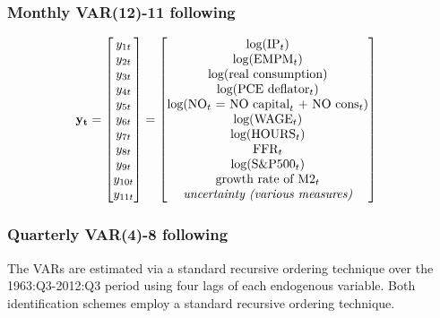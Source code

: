\documentclass[a4paper,11pt,listof=nochaptergap,oneside,pointednumbers,bibtotoc,bigheadings,liststotoc,hidelinks]{scrbook}
\theoremstyle{mysatz}
\theoremstyle{mydefinition}
\theoremstyle{mytheorem}
\theoremstyle{mybemerkung}
\newcommand{\vect}[1]{\boldsymbol{\mathbf{#1}}}
\begin{document}
\subsubsection{Monthly VAR(12)-11 following \citet{juradoetal:15}}
\begin{equation} \label{eq:VAR19}
\begin{split}
\vect{y_t} & = 
 \begin{bmatrix} 
 		y_{1t} \\
		y_{2t} \\
		y_{3t} \\
		y_{4t} \\
		y_{5t} \\
		y_{6t} \\
		y_{7t} \\
		y_{8t} \\
		y_{9t} \\
		y_{10t} \\
		y_{11t}
	      \end{bmatrix} = 	      
	      \begin{bmatrix} \text{log($\text{IP}_t$)} \\ 
				      \text{log($\text{EMPM}_t$)}\\ 
				      \text{log(real consumption)}\\
				      \text{log($\text{PCE deflator}_t$)}\\
				      \text{log($\text{NO}_t$ $=$ $\text{NO capital}_t$ $+$ $\text{NO cons}_t$)}\\
				      \text{log($\text{WAGE}_t$)}\\
				      \text{log($\text{HOURS}_t$)}\\
				      \text{$\text{FFR}_t$} \\
				      \text{log($\text{S\&P500}_t$)} \\
				      \text{growth rate of $\text{M2}_t$} \\
				      \text{\textit{uncertainty (various measures)}}
	      \end{bmatrix}
\end{split}
\end{equation}

\subsubsection{Quarterly VAR(4)-8 following \citet{gilchristetal:14}}
The VARs are estimated via a standard recursive ordering technique over the 1963:Q3-2012:Q3 period using four lags of each endogenous variable. Both identification schemes employ a standard recursive ordering technique.\\
\end{document}
